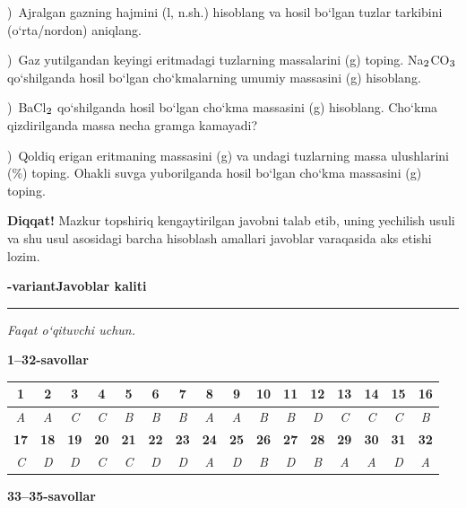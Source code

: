 \documentclass[11pt,a4paper]{article}
\renewcommand{\textsubscript}[1]{\ensuremath{_{\text{\fontsize{8}{8}\selectfont #1}}}}
\newcommand{\qsep}{\par\vspace{13pt}}
\newcommand{\diqqat}[1]{\par\smallskip\noindent\textbf{Diqqat!} #1\par\medskip}
\begin{document}
)\ Ajralgan gazning hajmini (l, n.sh.) hisoblang va hosil bo`lgan tuzlar tarkibini (o`rta/nordon) aniqlang.\par
{})\ Gaz yutilgandan keyingi eritmadagi tuzlarning massalarini (g) toping. Na\textsubscript{2}CO\textsubscript{3} qo`shilganda hosil bo`lgan cho`kmalarning umumiy massasini (g) hisoblang.\par
{})\ BaCl\textsubscript{2} qo`shilganda hosil bo`lgan cho`kma massasini (g) hisoblang. Cho`kma qizdirilganda massa necha gramga kamayadi?\par
{})\ Qoldiq erigan eritmaning massasini (g) va undagi tuzlarning massa ulushlarini (\%) toping. Ohakli suvga yuborilganda hosil bo`lgan cho`kma massasini (g) toping.\par
\diqqat{Mazkur topshiriq kengaytirilgan javobni talab etib, uning yechilish usuli va shu usul asosidagi barcha hisoblash amallari javoblar varaqasida aks etishi lozim.}\qsep
\newpage
\noindent\textbf{\fontsize{13}{15}-variant}\hfill \textbf{Javoblar kaliti}\par\smallskip\hrule\smallskip
\textit{Faqat o`qituvchi uchun.}\par\medskip
\noindent\textbf{1--32-savollar}\par\smallskip
\noindent\begin{tabular}{|c|c|c|c|c|c|c|c|c|c|c|c|c|c|c|c|}\hline
\textbf{1} & \textbf{2} & \textbf{3} & \textbf{4} & \textbf{5} & \textbf{6} & \textbf{7} & \textbf{8} & \textbf{9} & \textbf{10} & \textbf{11} & \textbf{12} & \textbf{13} & \textbf{14} & \textbf{15} & \textbf{16}\\\hline
\textsl{A} & \textsl{A} & \textsl{C} & \textsl{C} & \textsl{B} & \textsl{B} & \textsl{B} & \textsl{A} & \textsl{A} & \textsl{B} & \textsl{B} & \textsl{D} & \textsl{C} & \textsl{C} & \textsl{C} & \textsl{B}\\\hline
\textbf{17} & \textbf{18} & \textbf{19} & \textbf{20} & \textbf{21} & \textbf{22} & \textbf{23} & \textbf{24} & \textbf{25} & \textbf{26} & \textbf{27} & \textbf{28} & \textbf{29} & \textbf{30} & \textbf{31} & \textbf{32}\\\hline
\textsl{C} & \textsl{D} & \textsl{D} & \textsl{C} & \textsl{C} & \textsl{D} & \textsl{D} & \textsl{A} & \textsl{D} & \textsl{B} & \textsl{D} & \textsl{B} & \textsl{A} & \textsl{A} & \textsl{D} & \textsl{A}\\\hline
\end{tabular}\par\medskip
\noindent\textbf{33--35-savollar}\par\smallskip
\end{document}
